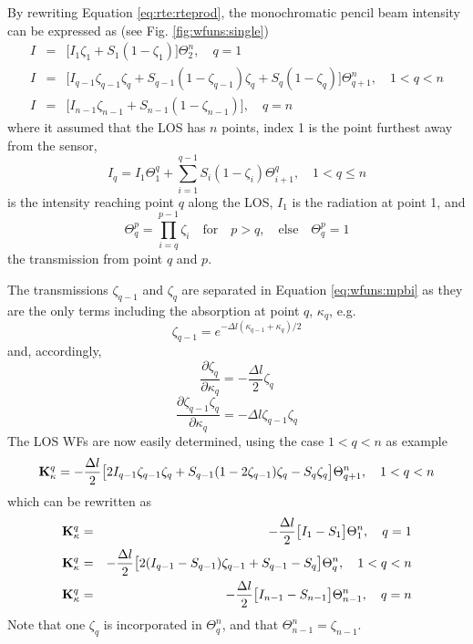  By rewriting Equation \ref{eq:rte:rteprod}, the monochromatic pencil beam
 intensity can be expressed as (see Fig. \ref{fig:wfuns:single})
 \begin{eqnarray}
   I &=& \big[I_1\zeta_1+S_1(1-\zeta_1)\big]\Theta^n_{2}, \quad q=1 
     \nonumber \\
   I &=&\big[I_{q-1}\zeta_{q-1}\zeta_q+S_{q-1}(1-\zeta_{q-1})\zeta_q +
            S_q(1-\zeta_q) \big] \Theta^n_{q+1}, \quad 1<q<n 
    \label{eq:wfuns:mpbi} \\
   I &=& \big[I_{n-1}\zeta_{n-1}+S_{n-1}(1-\zeta_{n-1})\big], \quad q=n
     \nonumber
 \end{eqnarray}
 where it assumed that the LOS has $n$ points, index 1 is the point
 furthest away from the sensor,
 \begin{equation}
   I_q = I_1 \Theta^{q}_{1} + \sum_{i=1}^{q-1}S_i(1-\zeta_i) 
             \Theta_{i+1}^{q}, \quad 1<q\leq n
  \label{eq:wfuns:iq}
 \end{equation}
 is the intensity reaching point $q$ along the LOS, $I_1$ is the radiation at
 point 1, and
 \begin{equation}
   \Theta_q^p = \prod_{i=q}^{p-1}\zeta_i\quad \mathrm{for} \quad p>q, 
     \quad \mathrm{else} \quad \Theta_q^p = 1
  \label{eq:wfuns:Theta}
 \end{equation}
 the transmission from point $q$ and $p$. 

 The transmissions $\zeta_{q-1}$ and $\zeta_q$ are separated in Equation
 \ref{eq:wfuns:mpbi} as they are the only terms including the absorption
 at point $q$, $\kappa_q$, e.g.
 \begin{equation}
   \zeta_{q-1} = e^{-\Delta l(\kappa_{q-1}+\kappa_q)/2}
 \end{equation}
 and, accordingly,
 \begin{equation}
   \frac{\partial \zeta_q}{\partial \kappa_q} = -\frac{\Delta l}{2}\zeta_q
  \label{eq:wfuns:dzeta1}
 \end{equation}
 \begin{equation}
   \frac{\partial \zeta_{q-1}\zeta_q}{\partial \kappa_q} = 
          -\Delta l \zeta_{q-1}\zeta_q
  \label{eq:wfuns:dzeta2}
 \end{equation}
 The LOS WFs are now easily determined, using the case $1<q<n$ as example
 \begin{equation}
   \mathbf{K}_{\kappa}^q = -\frac{\Delta l}{2} \big[ 2I_{q-1}\zeta_{q-1}\zeta_q+
     S_{q-1}(1-2\zeta_{q-1})\zeta_q - S_q\zeta_q \big] \Theta^n_{q+1}, 
     \quad 1<q<n
 \end{equation}
 which can be rewritten as
 \begin{eqnarray}
   \mathbf{K}_{\kappa}^q &=& -\frac{\Delta l}{2} \big[ I_{1}-S_1 \big] \Theta^n_1, \quad q=1 \nonumber \\
   \mathbf{K}_{\kappa}^q &=& -\frac{\Delta l}{2} \big[ 2(I_{q-1}-S_{q-1})\zeta_{q-1}+
           S_{q-1}-S_q \big] \Theta^n_q, \quad 1<q<n 
  \label{eq:wfuns:loswfsxx} \\
   \mathbf{K}_{\kappa}^q &=& -\frac{\Delta l}{2} \big[ I_{n-1}-S_{n-1} \big] \Theta^n_{n-1}, \quad q=n \nonumber
 \end{eqnarray}
 Note that one $\zeta_q$ is incorporated in $\Theta^n_q$, and that 
 $\Theta^n_{n-1}=\zeta_{n-1}$.
 
